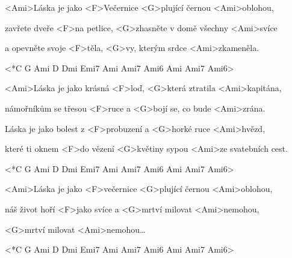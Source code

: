 

\zs
<Ami>Láska je jako <F>Večernice <G>plující černou <Ami>oblohou,

zavřete dveře <F>na petlice, <G>zhasněte v domě všechny <Ami>svíce

a opevněte svoje <F>těla, <G>vy, kterým srdce <Ami>zkameněla.

<*C G Ami D Dmi Emi7 Ami Ami7 Ami6 Ami Ami7 Ami6>
\ks

\zs
<Ami>Láska je jako krásná <F>loď, <G>která ztratila <Ami>kapitána,

námořníkům se třesou <F>ruce a <G>bojí se, co bude <Ami>zrána.

Láska je jako bolest z <F>probuzení a <G>horké ruce <Ami>hvězd,

které ti oknem <F>do vězení <G>květiny sypou <Ami>ze svatebních cest.

<*C G Ami D Dmi Emi7 Ami Ami7 Ami6 Ami Ami7 Ami6>
\ks

\zs
<Ami>Láska je jako <F>večernice <G>plující černou <Ami>oblohou,

náš život hoří <F>jako svíce a <G>mrtví milovat <Ami>nemohou,

<G>mrtví milovat <Ami>nemohou…

<*C G Ami D Dmi Emi7 Ami Ami7 Ami6 Ami Ami7 Ami6>
\ks

\kp
